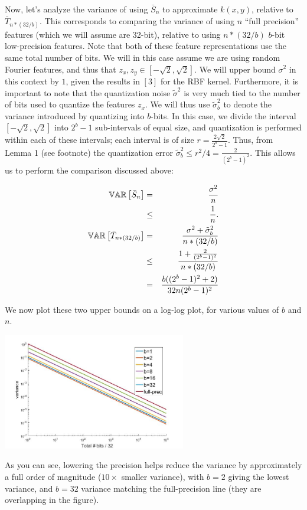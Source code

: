 \documentclass[12pt]{article}
\newcommand{\bS}{\bar{S}}
\newcommand{\bT}{\bar{T}}
\newcommand{\sq}{\sqrt{2}}
\newcommand{\tsigma}{\tilde{\sigma}}
\begin{document}
Now, let's analyze the variance of using $\bS_n$ to approximate $k(x,y)$, relative to $\bT_{n*(32/b)}$.  This corresponds to comparing the variance of using $n$ ``full precision''  features (which we will assume are 32-bit), relative to using $n*(32/b)$ $b$-bit low-precision features. Note that both of these feature representations use the same total number of bits.  We will in this case assume we are using random Fourier features, and thus that
$z_x,z_y \in [-\sq,\sq]$.  We will upper bound $\sigma^2$ in this context by $1$, given the results in $[3]$ for the RBF kernel.  Furthermore, it is important to note that the quantization noise $\tsigma^2$ is very much tied to the number of bits used to quantize the features $z_x$.  We will thus use $\tsigma_b^2$ to denote the variance introduced by quantizing into $b$-bits.  In this case, we divide the interval $[-\sq,\sq]$ into $2^b-1$ sub-intervals of equal size, and quantization is performed within each of these intervals; each interval is of size $r = \frac{2\sq}{2^b-1}$. 
Thus, from Lemma 1 (see footnote) the quantization error $\tsigma_b^2 \leq r^2/4 = \frac{2}{(2^b-1)^2}$.  This allows us to perform the comparison discussed above:

\begin{eqnarray*}
	\var{}{\bS_n} &=& \frac{\sigma^2}{n} \\
	&\leq& \frac{1}{n}. \\
	\var{}{\bT_{n*(32/b)}} &=& \frac{\sigma^2 + \tsigma_b^2}{n*(32/b)} \\
	&\leq& \frac{1 + \frac{2}{(2^b-1)^2}}{n*(32/b)}\\
	&=& \frac{b((2^b-1)^2 + 2)}{32n(2^b-1)^2}
\end{eqnarray*}

We now plot these two upper bounds on a log-log plot, for various values of $b$ and $n$.\\
\begin{center}
\includegraphics[width=0.6\textwidth]{lprff_variance_figure.jpg}
\end{center}
As you can see, lowering the precision helps reduce the variance by approximately a full order of magnitude ($10\times$ smaller variance), with $b=2$ giving the lowest variance, and $b=32$ variance matching the full-precision line (they are overlapping in the figure).
\end{document}

